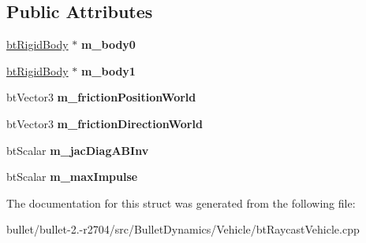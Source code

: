 \subsection*{Public Attributes}
\begin{DoxyCompactItemize}
\item 
\hypertarget{structbt_wheel_contact_point_a552bc66287fbc473742bc5f784dc7769}{\hyperlink{classbt_rigid_body}{bt\+Rigid\+Body} $\ast$ {\bfseries m\+\_\+body0}}\label{structbt_wheel_contact_point_a552bc66287fbc473742bc5f784dc7769}

\item 
\hypertarget{structbt_wheel_contact_point_a65f70ab5c71e46880e41f2775104519f}{\hyperlink{classbt_rigid_body}{bt\+Rigid\+Body} $\ast$ {\bfseries m\+\_\+body1}}\label{structbt_wheel_contact_point_a65f70ab5c71e46880e41f2775104519f}

\item 
\hypertarget{structbt_wheel_contact_point_afdddf099aa5bf319ae685227ae6b806d}{bt\+Vector3 {\bfseries m\+\_\+friction\+Position\+World}}\label{structbt_wheel_contact_point_afdddf099aa5bf319ae685227ae6b806d}

\item 
\hypertarget{structbt_wheel_contact_point_a00aa59f208fa00087e4b2570ca166c0e}{bt\+Vector3 {\bfseries m\+\_\+friction\+Direction\+World}}\label{structbt_wheel_contact_point_a00aa59f208fa00087e4b2570ca166c0e}

\item 
\hypertarget{structbt_wheel_contact_point_a6209038b417fef7b6544cfec44f68ba2}{bt\+Scalar {\bfseries m\+\_\+jac\+Diag\+A\+B\+Inv}}\label{structbt_wheel_contact_point_a6209038b417fef7b6544cfec44f68ba2}

\item 
\hypertarget{structbt_wheel_contact_point_a6cec1cf50a9c910ae785ceb8c31b67d7}{bt\+Scalar {\bfseries m\+\_\+max\+Impulse}}\label{structbt_wheel_contact_point_a6cec1cf50a9c910ae785ceb8c31b67d7}

\end{DoxyCompactItemize}


The documentation for this struct was generated from the following file\+:\begin{DoxyCompactItemize}
\item 
bullet/bullet-\/2.-\/r2704/src/\+Bullet\+Dynamics/\+Vehicle/bt\+Raycast\+Vehicle.\+cpp\end{DoxyCompactItemize}
